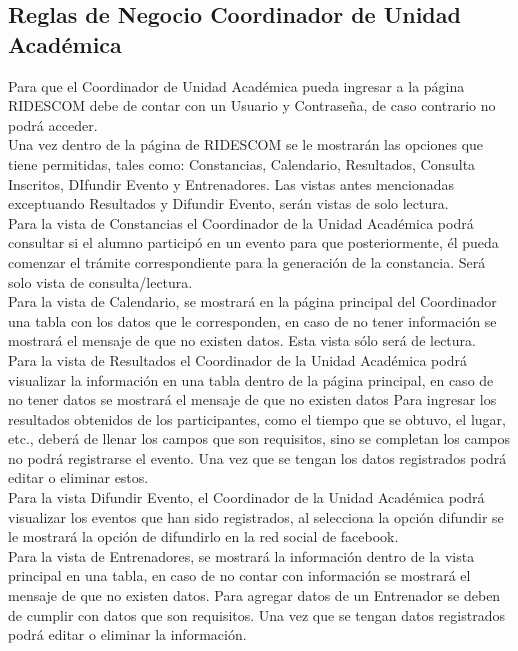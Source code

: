 \subsection{Reglas de Negocio Coordinador de Unidad Académica}
\noindent Para que el Coordinador de Unidad Académica pueda ingresar a la página RIDESCOM debe de contar con un Usuario y Contraseña, de caso contrario no podrá acceder.\\

\noindent Una vez dentro de la página de RIDESCOM se le mostrarán las opciones que tiene permitidas, tales como: Constancias, Calendario, Resultados, Consulta Inscritos, DIfundir Evento y Entrenadores. Las vistas antes mencionadas exceptuando Resultados y Difundir Evento, serán vistas de solo lectura.\\

\noindent Para la vista de Constancias el Coordinador de la Unidad Académica podrá consultar si el alumno participó en un evento para que posteriormente, él pueda comenzar el trámite correspondiente para la generación de la constancia. Será solo vista de consulta/lectura.\\

\noindent Para la vista de Calendario, se mostrará en la página principal del Coordinador una tabla con los datos que le corresponden, en caso de no tener información se mostrará el mensaje de que no existen datos. Esta vista sólo será de lectura.\\

\noindent Para la vista de Resultados el Coordinador de la Unidad Académica podrá visualizar la información en una tabla dentro de la página principal, en caso de no tener datos se mostrará el mensaje de que no existen datos Para ingresar los resultados obtenidos de los participantes, como el tiempo que se obtuvo, el lugar, etc., deberá de llenar los campos que son requisitos, sino se completan los campos no podrá registrarse el evento. Una vez que se tengan los datos registrados podrá editar o eliminar estos.\\

\noindent Para la vista Difundir Evento, el Coordinador de la Unidad Académica podrá visualizar los eventos que han sido registrados, al selecciona la opción difundir se le mostrará la opción de difundirlo en la red social de facebook.\\

\noindent Para la vista de Entrenadores, se mostrará la información dentro de la vista principal en una tabla, en caso de no contar con información se mostrará el mensaje de que no existen datos. Para agregar datos de un Entrenador se deben de cumplir con datos que son requisitos. Una vez que se tengan datos registrados podrá editar o eliminar la información. \\

